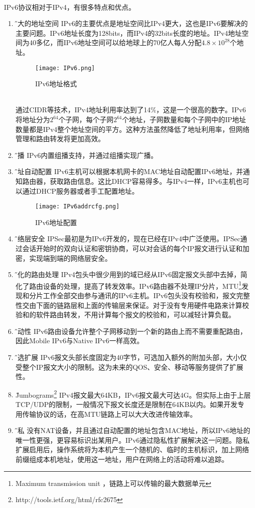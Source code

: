 \documentclass[a4paper,14pt,openany]{article}
\begin{document}
\paragraph{}
IPv6协议相对于IPv4，有很多特点和优点。
\begin{enumerate}
\item{\H 更大的地址空间}
IPv6的主要优点是地址空间比IPv4更大，这也是IPv6要解决的主要问题。IPv6地址长度为128bits，而IPv4的32bits长度的地址。IPv4地址空间为40多亿，而IPv6地址空间可以给地球上的70亿人每人分配$4.8 \times 10^{28}$个地址。
\begin{figure}[htbp]
\small
\centering
\texttt{[image: IPv6.png]}
\caption{IPv6地址格式}
\label{fig:IPv6}
\end{figure}
\\
通过CIDR等技术，IPv4地址利用率达到了14\%，这是一个很高的数字。IPv6将地址分为$2^{64}$个子网，每个子网$2^{64}$个地址，子网数量和每个子网中的IP地址数量都是IPv4整个地址空间的平方。这种方法虽然降低了地址利用率，但网络管理和路由转发将更加高效。
\item{\H 组播}
IPv6内置组播支持，并通过组播实现广播。
\item{\H 地址自动配置}
IPv6主机可以根据本机网卡的MAC地址自动配置IPv6地址，并通知路由器，获取路由信息。这比DHCP容易得多。与IPv4一样，IPv6主机也可以通过DHCP服务器或者手工配置地址。
\begin{figure}[htbp]
\small
\centering
\texttt{[image: IPv6addrcfg.png]}
\caption{IPv6地址配置}
\label{fig:IPv6}
\end{figure}
\item{\H 网络层安全}
IPSec最初是为IPv6开发的，现在已经在IPv4中广泛使用。IPSec通过会话开始时的双向认证和密钥协商，可以对会话的每个IP报文进行认证和加密，实现端到端的网络层安全。
\item{\H 简化的路由处理}
IPv4包头中很少用到的域已经从IPv6固定报文头部中去掉，简化了路由设备的处理，提高了转发效率。IPv6路由器不处理IP分片，MTU\footnote{Maximum transmission unit
，链路上可以传输的最大数据单元}发现和分片工作全部交由参与通讯的IPv6主机。IPv6包头没有校验和，报文完整性交由下面的链路层和上面的传输层来保证。对于没有专用硬件电路来计算校验和的软件路由转发，不用计算每个报文的校验和，可以减轻计算负载。
\item{\H 移动性}
IPv6路由设备允许整个子网移动到一个新的路由上而不需要重配路由，因此Mobile IPv6与Native IPv6一样高效。
\item{\H 可选扩展}
IPv6报文头部长度固定为40字节，可选加入额外的附加头部，大小仅受整个IP报文大小的限制。这为未来的QOS、安全、移动等服务提供了扩展性。
\item{\H Jumbograms}\footnote{http://tools.ietf.org/html/rfc2675}
IPv4报文最大64KB，IPv6报文最大可达4G。但实际上由于上层TCP/UDP的限制，一般情况下报文长度还是限制在64KB以内。如果开发专用传输协议的话，在高MTU链路上可以大大改进传输效率。
\item{\H 隐私}
没有NAT设备，并且通过自动配置的地址包含MAC地址，所以IPv6地址的唯一性更强，更容易标识出某用户。IPv6通过隐私性扩展解决这一问题。隐私扩展启用后，操作系统将为本机产生一个随机的、临时的主机标识，加上网络前缀组成本机地址，使用这一地址，用户在网络上的活动将难以追踪。
\end{enumerate}
\end{document}
